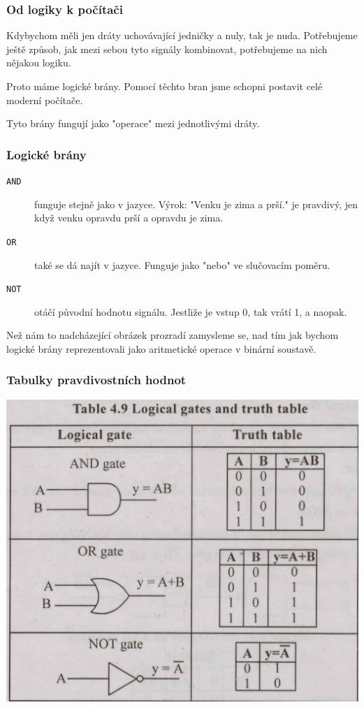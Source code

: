 \documentclass{beamer}
\begin{document}
\begin{frame}
	\frametitle{Od logiky k počítači}
	Kdybychom měli jen dráty uchovávající jedničky a nuly, tak je nuda. Potřebujeme
	ještě způsob, jak mezi sebou tyto signály kombinovat, potřebujeme na nich
	nějakou logiku.

	\vfill

	Proto máme logické brány. Pomocí těchto bran jsme schopni postavit celé moderní
	počítače.

	\vfill

	Tyto brány fungují jako "operace" mezi jednotlivými dráty.
\end{frame}

\begin{frame}
	\frametitle{Logické brány}
	\begin{description}
		\item[\texttt{AND}] funguje stejně jako v jazyce. Výrok: "Venku je zima a
		 prší." je pravdivý, jen když venku opravdu prší a opravdu je zima.
		\item[\texttt{OR}] také se dá najít v jazyce. Funguje jako "nebo" ve
		      slučovacím poměru.
		\item[\texttt{NOT}] otáčí původní hodnotu signálu. Jestliže je vstup 0, tak
		      vrátí 1, a naopak.
	\end{description}

	Než nám to nadcházející obrázek prozradí zamysleme se, nad tím jak bychom
	logické brány reprezentovali jako aritmetické operace v binární soustavě.
\end{frame}

\begin{frame}
	\frametitle{Tabulky pravdivostních hodnot}
	\includegraphics[scale=0.14]{gates.jpg}
\end{frame}
\end{document}
